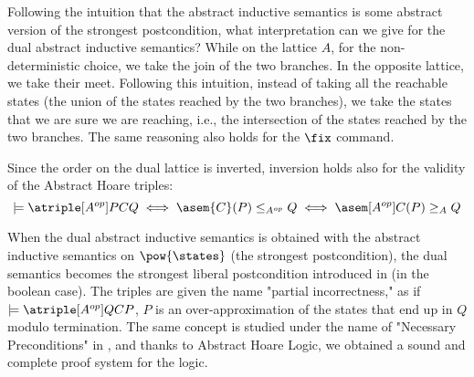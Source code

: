 Following the intuition that the abstract inductive semantics is some abstract
version of the strongest postcondition, what interpretation can we give for the
dual abstract inductive semantics? While on the lattice $A$, for the
non-deterministic choice, we take the join of the two branches. In the opposite
lattice, we take their meet. Following this intuition, instead of taking all
the reachable states (the union of the states reached by the two branches), we
take the states that we are sure we are reaching, i.e., the intersection of the
states reached by the two branches. The same reasoning also holds for the
$\fix$ command.

Since the order on the dual lattice is inverted, inversion holds also for the
validity of the Abstract Hoare triples: $$\models \atriple[A^{op}]{P}{C}{Q}
\iff \asem{C}(P) \leq_{A^{op}} Q \iff \asem[A^{op}]{C}(P) \geq_A Q$$

When the dual abstract inductive semantics is obtained with the abstract
inductive semantics on $\pow{\states}$ (the strongest postcondition), the dual
semantics becomes the strongest liberal postcondition introduced in
\cite{Zhang22} (in the boolean case). The triples are given the name "partial
incorrectness," as if $\models \atriple[A^{op}]{Q}{C}{P}$, $P$ is an
over-approximation of the states that end up in $Q$ modulo termination. The
same concept is studied under the name of "Necessary Preconditions" in
\cite{Cousot13}, and thanks to Abstract Hoare Logic, we obtained a sound and
complete proof system for the logic.

